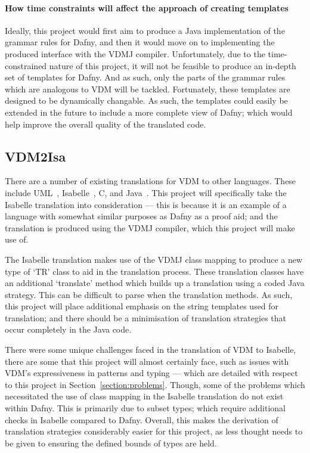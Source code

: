 \documentclass{entcs}
\begin{document}
\paragraph{How time constraints will affect the approach of creating templates}

Ideally, this project would first aim to produce a Java implementation of the grammar rules for Dafny, and then it would move on to implementing the produced interface with the VDMJ compiler. Unfortunately, due to the time-constrained nature of this project, it will not be feasible to produce an in-depth set of templates for Dafny. And as such, only the parts of the grammar rules which are analogous to VDM will be tackled. Fortunately, these templates are designed to be dynamically changable. As such, the templates could easily be extended in the future to include a more complete view of Dafny; which would help improve the overall quality of the translated code.

\subsection{VDM2Isa}

There are a number of existing translations for VDM to other languages. These include UML~\cite{VDM2UML}, Isabelle~\cite{VDM2ISA}, C, and Java~\cite{VDMToolSupport}. This project will specifically take the Isabelle translation into consideration --- this is because it is an example of a language with somewhat similar purposes as Dafny as a proof aid; and the translation is produced using the VDMJ compiler, which this project will make use of. 

The Isabelle translation makes use of the VDMJ class mapping to produce a new type of `TR' class to aid in the translation process. These translation classes have an additional `translate' method which builds up a translation using a coded Java strategy. This can be difficult to parse when the translation methods. As such, this project will place additional emphasis on the string templates used for translation; and there should be a minimisation of translation strategies that occur completely in the Java code.

There were some unique challenges faced in the translation of VDM to Isabelle, there are some that this project will almost certainly face, such as issues with VDM's expressiveness in patterns and typing --- which are detailed with respect to this project in Section~\ref{section:problems}. Though, some of the problems which necessitated the use of class mapping in the Isabelle translation do not exist within Dafny. This is primarily due to subset types; which require additional checks in Isabelle compared to Dafny. Overall, this makes the derivation of translation strategies considerably easier for this project, as less thought needs to be given to ensuring the defined bounds of types are held.
\end{document}
